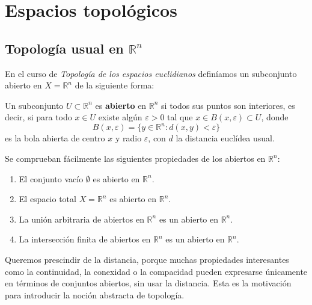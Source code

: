 ﻿\section{Espacios topológicos}


\subsection{Topología usual en $\mathbb{R}^n$}

En el curso de \emph{Topología de los espacios euclidianos} definíamos un subconjunto abierto en $X = \mathbb{R}^n$ de la siguiente forma:

\begin{definición}
    Un subconjunto $U \subset \mathbb{R}^n$ es \textbf{abierto} en $\mathbb{R}^n$ si todos sus puntos son interiores, es decir, si para todo $x \in U$ existe algún $\varepsilon > 0$ tal que $x \in B(x, \varepsilon) \subset U$, donde
    $$B(x, \varepsilon) = \{y \in \mathbb{R}^n : d(x,y) < \varepsilon\}$$
    es la bola abierta de centro $x$ y radio $\varepsilon$, con $d$ la distancia euclídea usual.
\end{definición}

Se comprueban fácilmente las siguientes propiedades de los abiertos en $\mathbb{R}^n$:
\begin{enumerate}
    \item El conjunto vacío $\emptyset$ es abierto en $\mathbb{R}^n$.
    \item El espacio total $X = \mathbb{R}^n$ es abierto en $\mathbb{R}^n$.
    \item La unión arbitraria de abiertos en $\mathbb{R}^n$ es un abierto en $\mathbb{R}^n$.
    \item La intersección finita de abiertos en $\mathbb{R}^n$ es un abierto en $\mathbb{R}^n$.
\end{enumerate}


\begin{observación}
    Queremos prescindir de la distancia, porque muchas propiedades interesantes como la continuidad, la conexidad o la compacidad pueden expresarse únicamente en términos de conjuntos abiertos, sin usar la distancia. Esta es la motivación para introducir la noción abstracta de topología.
\end{observación}

